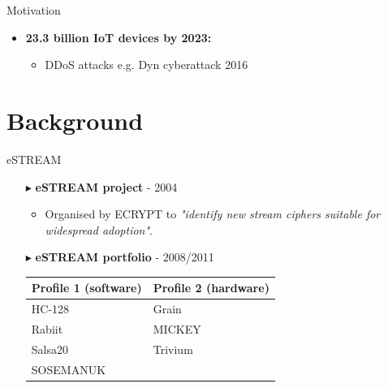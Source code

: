 \documentclass[10pt, compress]{beamer}
\begin{document}
\begin{frame}{Motivation}
\begin{itemize}[itemsep=0.5cm]
\item \textbf{23.3 billion IoT devices by 2023:}
\begin{itemize}
\item DDoS attacks e.g. Dyn cyberattack 2016
\end{itemize}
\end{itemize}
\end{frame}

\section{Background}

\begin{frame}{eSTREAM}
\begin{itemize}[itemsep=0.5cm]
\item[$\blacktriangleright$] \textbf{eSTREAM project} - 2004
\begin{itemize}
\item Organised by ECRYPT to \textit{"identify new stream ciphers suitable for widespread adoption"}.
\end{itemize}
\item[$\blacktriangleright$] \textbf{eSTREAM portfolio} - 2008/2011
\begin{table}
\centering
\begin{tabular}{l|l}
Profile 1 (software) & Profile 2 (hardware)\\\hline
HC-128 & Grain\\
Rabiit & MICKEY\\
Salsa20 & Trivium\\
SOSEMANUK &
\end{tabular}
\end{table}
\end{itemize}
\end{frame}
\end{document}
